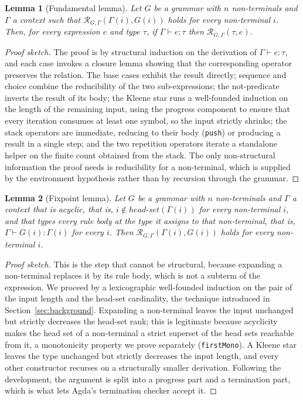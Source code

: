 \documentclass[preprint,12pt]{elsarticle}
\newtheorem{Lemma}{Lemma}
\theoremstyle{definition}
\newenvironment{proofsketch}
  {\renewcommand{\qedsymbol}{$\blacksquare$}\begin{proof}[Proof sketch]}
  {\end{proof}}
\begin{document}
\begin{Lemma}[Fundamental lemma]\label{lem:fundamental}
Let $G$ be a grammar with $n$ non-terminals and $\Gamma$ a context such that
$\mathcal{R}_{G,\Gamma}(\Gamma(i), G(i))$ holds for every non-terminal $i$. Then,
for every expression $e$ and type $\tau$, if $\Gamma \vdash e : \tau$ then
$\mathcal{R}_{G,\Gamma}(\tau, e)$.
\end{Lemma}

\begin{proofsketch}
The proof is by structural
induction on the derivation of $\Gamma \vdash e : \tau$, and each case
invokes a closure lemma showing that the corresponding operator preserves the
relation. The base cases exhibit the result directly; sequence and choice combine
the reducibility of the two sub-expressions; the not-predicate inverts the result
of its body; the Kleene star runs a well-founded induction on the length of the
remaining input, using the progress component to ensure that every iteration
consumes at least one symbol, so the input strictly shrinks; the stack operators
are immediate, reducing to their body (\lstinline{push}) or producing a result in
a single step; and the two repetition operators iterate a standalone helper on the
finite count obtained from the stack. The only non-structural information the proof
needs is reducibility for a non-terminal, which is supplied by the environment
hypothesis rather than by recursion through the grammar.
\end{proofsketch}

\begin{Lemma}[Fixpoint lemma]\label{lem:fixpoint}
Let $G$ be a grammar with $n$ non-terminals and $\Gamma$ a context that is
acyclic, that is, $i \notin \mathit{head\text{-}set}(\Gamma(i))$ for every
non-terminal $i$, and that types every rule body at the type it assigns to that
non-terminal, that is, $\Gamma \vdash G(i) : \Gamma(i)$ for every $i$. Then
$\mathcal{R}_{G,\Gamma}(\Gamma(i), G(i))$ holds for every non-terminal $i$.
\end{Lemma}

\begin{proofsketch}
This is the step that cannot be
structural, because expanding a non-terminal replaces it by its rule body, which
is not a subterm of the expression. We proceed by a lexicographic well-founded
induction on the pair of the input length and the head-set cardinality, the
technique introduced in Section~\ref{sec:background}. Expanding a non-terminal
leaves the input unchanged but strictly decreases the head-set rank; this is
legitimate because acyclicity makes the head set of a non-terminal a strict
superset of the head sets reachable from it, a monotonicity property we prove
separately (\lstinline{firstMono}). A Kleene star leaves the type unchanged but
strictly decreases the input length, and every other constructor recurses on a
structurally smaller derivation. Following the development, the argument is split
into a progress part and a termination part, which is what lets Agda's termination
checker accept it.
\end{proofsketch}
\end{document}
